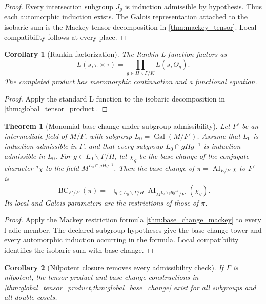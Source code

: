 \documentclass{aomart}
\newtheorem{theorem}{Theorem}[section]
\newtheorem{corollary}[corollary]{Corollary}
\theoremstyle{definition}
\theoremstyle{remark}
\newcommand{\Gal}{\operatorname{Gal}}
\newcommand{\AI}{\operatorname{AI}}
\newcommand{\BC}{\operatorname{BC}}
\newcommand{\boxplusop}{\mathbin{\boxplus}}
\begin{document}
\begin{proof}
Every intersection subgroup \(J_g\) is induction admissible by hypothesis. Thus each automorphic induction exists. The Galois representation attached to the isobaric sum is the Mackey tensor decomposition in \cref{thm:mackey_tensor}. Local compatibility follows at every place.
\end{proof}

\begin{corollary}[Rankin factorization]\label{cor:rankin_factorization}
The Rankin L function factors as
\[
\boxed{
L(s,\pi\times\tau)
=
\prod_{g\in H\backslash\Gamma/K}
L(s,\Theta_g).
}
\]
The completed product has meromorphic continuation and a functional equation.
\end{corollary}

\begin{proof}
Apply the standard L function to the isobaric decomposition in \cref{thm:global_tensor_product}.
\end{proof}

\begin{theorem}[Monomial base change under subgroup admissibility]\label{thm:global_base_change}
Let \(F'\) be an intermediate field of \(M/F\), with subgroup \(L_0=\Gal(M/F')\). Assume that \(L_0\) is induction admissible in \(\Gamma\), and that every subgroup \(L_0\cap gHg^{-1}\) is induction admissible in \(L_0\). For \(g\in L_0\backslash\Gamma/H\), let \(\chi_g\) be the base change of the conjugate character \({}^g\chi\) to the field \(M^{L_0\cap gHg^{-1}}\). Then the base change of \(\pi=\AI_{E/F}\chi\) to \(F'\) is
\[
\boxed{
\BC_{F'/F}(\pi)
=
\boxplusop_{g\in L_0\backslash\Gamma/H}
\AI_{M^{L_0\cap gHg^{-1}}/F'}
\left(\chi_g\right).
}
\]
Its local and Galois parameters are the restrictions of those of \(\pi\).
\end{theorem}

\begin{proof}
Apply the Mackey restriction formula \cref{thm:base_change_mackey} to every l adic member. The declared subgroup hypotheses give the base change tower and every automorphic induction occurring in the formula. Local compatibility identifies the isobaric sum with base change.
\end{proof}

\begin{corollary}[Nilpotent closure removes every admissibility check]\label{cor:nilpotent_tensor_basechange}
If \(\Gamma\) is nilpotent, the tensor product and base change constructions in \cref{thm:global_tensor_product,thm:global_base_change} exist for all subgroups and all double cosets.
\end{corollary}
\end{document}
